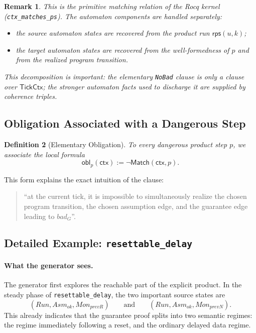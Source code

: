 \documentclass[11pt,a4paper]{article}
\newtheorem{definition}{Definition}[section]
\newtheorem{remark}[definition]{Remark}
\newcommand{\TickCtx}{\mathsf{TickCtx}}
\newcommand{\Match}{\mathsf{Match}}
\newcommand{\rps}{\mathsf{rps}}
\newcommand{\ctx}{\mathsf{ctx}}
\begin{document}
\begin{remark}
This is the primitive matching relation of the Rocq kernel
(\texttt{ctx\_matches\_ps}). The automaton components are handled separately:
\begin{itemize}[leftmargin=1.4em]
\item the source automaton states are recovered from the product run
  \(\rps(u,k)\);
\item the target automaton states are recovered from the well-formedness of
  \(p\) and from the realized program transition.
\end{itemize}
This decomposition is important: the elementary \texttt{NoBad} clause is only a
clause over \(\TickCtx\); the stronger automaton facts used to discharge it are
supplied by coherence triples.
\end{remark}

\subsection{Obligation Associated with a Dangerous Step}

\begin{definition}[Elementary Obligation]
To every dangerous product step \(p\), we associate the local formula
\[
\mathsf{obl}_p(\ctx) := \neg \Match(\ctx,p).
\]
\end{definition}

This form explains the exact intuition of the clause:
\begin{quote}
``at the current tick, it is impossible to simultaneously realize the chosen
program transition, the chosen assumption edge, and the guarantee edge leading
to \(bad_G\)''.
\end{quote}

\subsection{Detailed Example: \texttt{resettable\_delay}}

\paragraph{What the generator sees.}
The generator first explores the reachable part of the explicit product. In the
steady phase of \texttt{resettable\_delay}, the two important source states are
\[
(Run,Asm_{ok},Mon_{prevR})
\qquad\text{and}\qquad
(Run,Asm_{ok},Mon_{prevN}).
\]
This already indicates that the guarantee proof splits into two semantic
regimes: the regime immediately following a reset, and the ordinary delayed
data regime.
\end{document}
